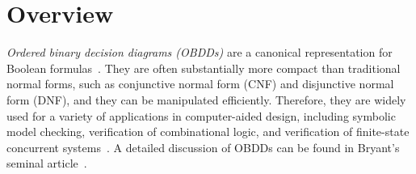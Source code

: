 \section{Overview}
\label{sec:OBDDs}

{\it Ordered binary decision diagrams (OBDDs)}  are a canonical 
representation for Boolean formulas~\cite{Bryant:BDD}. They are often
substantially more compact than traditional normal forms, such as
conjunctive normal form (CNF) and disjunctive normal form (DNF), and
they can be manipulated efficiently. Therefore, they are widely used for a
variety of applications in computer-aided design, including symbolic
model checking, verification of combinational logic, and verification of
finite-state concurrent systems~\cite{Clarke:book}.  A detailed
discussion of OBDDs can be found in Bryant's seminal
article~\cite{Bryant:BDD}.



